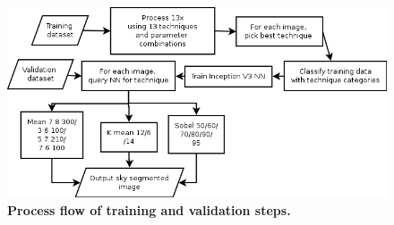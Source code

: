 \documentclass[final,3p,times,authoryear]{elsarticle}
\begin{document}



\begin{figure}
\centering    
\includegraphics[scale=0.60]{Images/TrainingProcessDiagram}
\caption{\bf Process flow of training and validation steps.}    
 \label{fig:process}  
\end{figure} 
\end{document}
